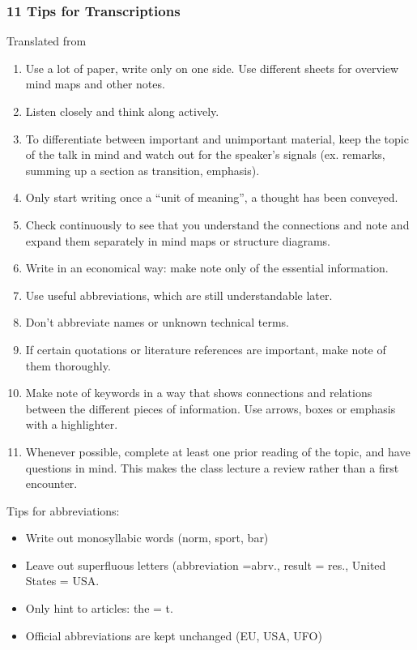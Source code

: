 \documentclass[../main.tex]{subfiles}
\begin{document}
\subsubsection{11 Tips for Transcriptions}
Translated from~\cite{Teachsam}

\begin{enumerate}
\item Use a {lot of paper}, write only on one side. Use different sheets for overview mind maps and other notes.
\item {Listen closely} and {think along actively}.
\item To differentiate between important and unimportant material, keep the topic of the talk in mind and watch out for the {speaker's signals} (ex. remarks, summing up a section as transition, emphasis). 
\item Only start writing once a ``unit of meaning'', a thought has been conveyed. 
\item Check continuously to see that you {understand the connections} and note and expand them separately in {mind maps or structure diagrams}.
\item Write in an {economical} way: make  note only of the {essential} information.
\item Use {useful abbreviations}, which are still understandable later.
\item {Don't abbreviate names} or unknown technical terms.
\item If certain {quotations or literature references} are important, make note of  them {thoroughly}.  
\item Make note of keywords in a way that shows {connections and relations} between the different pieces of information. Use {arrows, boxes or emphasis} with a highlighter. 
\item Whenever possible, complete at least one {prior reading of the topic}, and have {questions} in mind. This makes the class lecture a review rather than a first encounter.
\end{enumerate}

\newpage
Tips for abbreviations:

\begin{itemize}
\item Write out monosyllabic words (norm, sport, bar)
\item Leave out superfluous letters (abbreviation =abrv., result = res., United States = USA.
\item Only hint to articles: the = t. 
\item Official abbreviations are kept unchanged (EU, USA, UFO)
\end{itemize}
\end{document}
